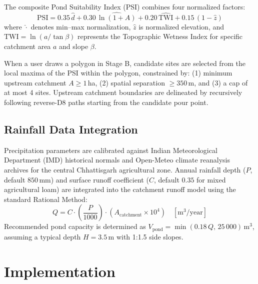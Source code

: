 \documentclass[manuscript,screen,review]{acmart}
\begin{document}
The composite Pond Suitability Index (PSI) combines four normalized factors:
\begin{equation}
    \text{PSI} = 0.35\,\hat{d} + 0.30\,\widehat{\ln(1+A)} + 0.20\,\widehat{\text{TWI}} + 0.15\,(1-\hat{z})
\end{equation}
where $\hat{\cdot}$ denotes min--max normalization, $\hat{z}$ is normalized elevation, and $\text{TWI} = \ln(a / \tan\beta)$ represents the Topographic Wetness Index for specific catchment area $a$ and slope $\beta$.

When a user draws a polygon in Stage B, candidate sites are selected from the local maxima of the PSI within the polygon, constrained by:
(1) minimum upstream catchment $A \ge 1$\,ha, (2) spatial separation $\ge 350$\,m, and (3) a cap of at most 4 sites. Upstream catchment boundaries are delineated by recursively following reverse-D8 paths starting from the candidate pour point.

\subsection{Rainfall Data Integration}
Precipitation parameters are calibrated against Indian Meteorological Department (IMD) historical normals and Open-Meteo climate reanalysis archives for the central Chhattisgarh agricultural zone. Annual rainfall depth ($P$, default $850$\,mm) and surface runoff coefficient ($C$, default $0.35$ for mixed agricultural loam) are integrated into the catchment runoff model using the standard Rational Method:
\begin{equation}
    Q = C \cdot \left(\frac{P}{1000}\right) \cdot \left(A_{\text{catchment}} \times 10^4\right) \quad [\text{m}^3/\text{year}]
\end{equation}
Recommended pond capacity is determined as $V_{\text{pond}} = \min(0.18\,Q,\,25\,000)\,\text{m}^3$, assuming a typical depth $H = 3.5$\,m with 1:1.5 side slopes.

\section{Implementation}
\label{sec:implementation}
\end{document}
